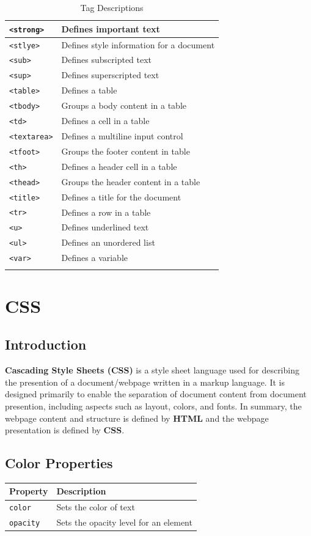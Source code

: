 \documentclass[11pt, letterpaper]{article}
\begin{document}
\begin{longtable}{l l}
			\texttt{<strong>} & Defines important text\\\midrule
			\texttt{<stlye>} & Defines style information for a document\\\midrule
			\texttt{<sub>} & Defines subscripted text\\\midrule
			\texttt{<sup>} & Defines superscripted text\\\midrule
			\texttt{<table>} & Defines a table\\\midrule
			\texttt{<tbody>} & Groups a body content in a table\\\midrule
			\texttt{<td>} & Defines a cell in a table\\\midrule
			\texttt{<textarea>} & Defines a multiline input control\\\midrule
			\texttt{<tfoot>} & Groups the footer content in table\\\midrule
			\texttt{<th>} & Defines a header cell in a table\\\midrule
			\texttt{<thead>} & Groups the header content in a table\\\midrule
			\texttt{<title>} & Defines a title for the document\\\midrule
			\texttt{<tr>} & Defines a row in a table\\\midrule
			\texttt{<u>} & Defines underlined text\\\midrule
			\texttt{<ul>} & Defines an unordered list\\\midrule
			\texttt{<var>} & Defines a variable\\
			\bottomrule
			\caption{Tag Descriptions}
		\end{longtable}
	\section{CSS}
		\subsection{Introduction}
		\textbf{Cascading Style Sheets (CSS)} is a style sheet language used for describing the presention of a document/webpage written in a markup language. It is designed primarily to enable the separation of document content from document presention, including aspects such as layout, colors, and fonts. In summary, the webpage content and structure is defined by \textbf{HTML} and the webpage presentation is defined by \textbf{CSS}.
		
		\subsection{Color Properties}
			\begin{longtable}{p{5cm} p{10cm}}
				\toprule
				Property & Description \\\midrule 
				\texttt{color} & Sets the color of text \\\midrule
				\texttt{opacity} & Sets the opacity level for an element \\\bottomrule
			\end{longtable}
		
\end{document}
